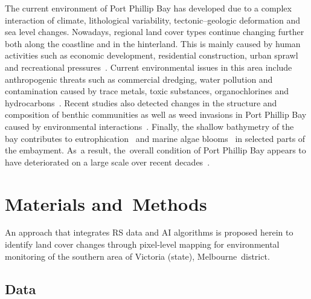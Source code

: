 \documentclass[jmse,article,accept,pdftex,oneauthor]{Definitions/mdpi}
\begin{document}
The current environment of Port Phillip Bay has developed due to a complex interaction of climate, lithological variability, tectonic--geologic deformation and sea level changes. Nowadays, {regional} land cover types{ }continue changing further both along the coastline and in the hinterland{. This} is mainly caused by human activities such as economic development, residential construction{, }urban sprawl {and} recreational pressures~\cite{FultonSmith}. Current environmental issues in this area include anthropogenic threats such as commercial dredging, water pollution and contamination caused by trace metals, toxic substances, organochlorines and hydrocarbons~\cite{PHILLIPS1992200}. {Recent} studies also detected changes {in} the structure and composition of benthic communities {as well as} weed invasions in Port Phillip Bay caused by environmental interactions~\cite{CURRIE199936}. Finally, the shallow bathymetry of the {bay} contributes to eutrophication~\cite{FultonSmith} and marine algae blooms~\cite{md18030142,976565} in selected parts of the embayment. As~a result, the~overall condition of Port Phillip Bay appears to have deteriorated on a large scale over recent decades~\cite{JUNG201193}.

\section{Materials and~Methods}

An %
 approach that integrates RS data and AI algorithms is proposed herein to identify land cover changes through pixel-level mapping for {environmental }monitoring{ of the }southern area of Victoria (state), Melbourne~district. 

\subsection{Data}
\end{document}
